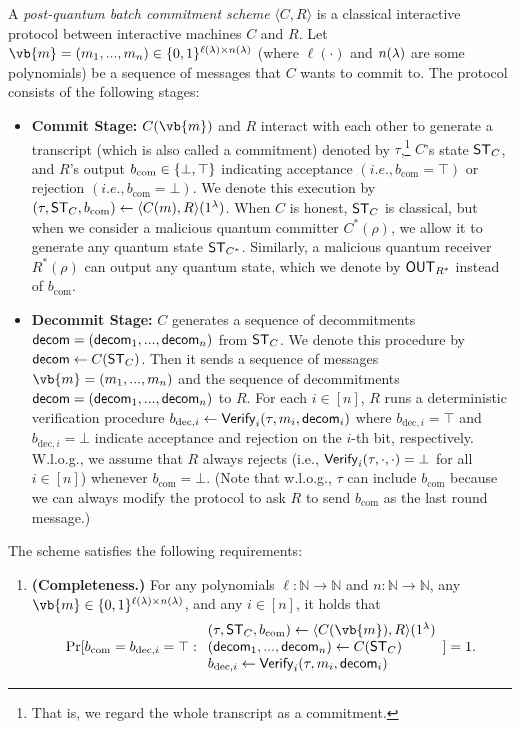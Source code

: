 \begin{definition}\label{def:bcom}
A {\em post-quantum batch commitment scheme}  $\langle C, R \rangle$ is a classical interactive protocol between interactive \PPT machines $C$ and $R$. Let $\vb{m}=(m_1,...,m_n)\in \bits^{\ell(\secpar)\times n(\secpar)}$ (where $\ell(\cdot)$ and $n(\lambda)$ are some polynomials) be a sequence of messages that $C$ wants to commit to. The protocol consists of the following stages:
\begin{itemize}
\item
{\bf Commit Stage:} $C(\vb{m})$ and $R$ interact with each other to generate a transcript (which is also called a commitment) denoted by $\tau$,\footnote{That is, we regard the whole transcript as a commitment.} 
$C$'s state $\mathsf{ST}_{C}$, and 
$R$'s output $b_{\mathrm{com}}\in\{\bot,\top\}$ indicating acceptance $(i.e., b_{\mathrm{com}}=\top)$ 
or rejection $(i.e., b_{\mathrm{com}}=\bot)$.
 We denote this execution by $(\tau,\mathsf{ST}_{C},b_{\mathrm{com}}) \gets \langle C(m), R \rangle(1^\lambda)$. When $C$ is honest, $\mathsf{ST}_C$ is classical, but when we consider a malicious quantum committer $C^*(\rho)$, we allow it to generate any quantum state $\mathsf{ST}_{C^*}$. 
 Similarly, a malicious quantum receiver $R^*(\rho)$ can output any quantum state, which we denote by $\mathsf{OUT}_{R^*}$ instead of $b_{\mathrm{com}}$. 
\item
{\bf Decommit Stage:}
$C$ generates a sequence of decommitments $\mathsf{decom}=(\mathsf{decom}_1,...,\mathsf{decom}_n)$ from $\mathsf{ST}_C$.
We denote this procedure by $\mathsf{decom} \gets C(\mathsf{ST}_C)$. 
Then it sends a sequence of messages $\vb{m}=(m_1,...,m_n)$ and the sequence of decommitments $\mathsf{decom}=(\mathsf{decom}_1,...,\mathsf{decom}_n)$ to $R$. 
For each $i\in [n]$, 
$R$ runs a deterministic verification procedure $b_{\mathrm{dec},i} \gets \mathsf{Verify}_i(\tau,m_i,\mathsf{decom}_i)$ 
where $b_{\mathrm{dec},i}=\top$ and $b_{\mathrm{dec},i}=\bot$  indicate acceptance and rejection on the $i$-th bit, respectively. 
W.l.o.g., we assume that $R$ always rejects (i.e., $\mathsf{Verify}_i(\tau,\cdot,\cdot) = \bot$ for all $i\in [n]$) whenever $b_\mathrm{com} = \bot$. (Note that w.l.o.g., $\tau$ can include $b_\mathrm{com}$ because we can always modify the protocol to ask $R$ to send $b_\mathrm{com}$ as the last round message.)
\end{itemize}

The scheme satisfies the following requirements:
\begin{enumerate}
\item
{\bf (Completeness.)} For any polynomials $\ell:\mathbb{N} \rightarrow \mathbb{N}$ 
and $n:\mathbb{N} \rightarrow \mathbb{N}$, any $\vb{m} \in \bits^{\ell(\secpar)\times n(\secpar)}$, and any $i\in [n]$, it holds that
\begin{equation*}
\Pr[
b_{\mathrm{com}}=b_{\mathrm{dec},i}=\top
: 
\begin{array}{l}
(\tau, \ST_{C}, b_{\mathrm{com}}) \gets \langle C(\vb{m}),R \rangle(1^\secpar) \\
(\decom_1,...,\decom_n) \gets C(\ST_C)\\
 b_{\mathrm{dec},i}\gets \Verify_i(\tau,m_i,\decom_i)
\end{array}
] = 1.
\end{equation*}


\end{enumerate}
\end{definition}
